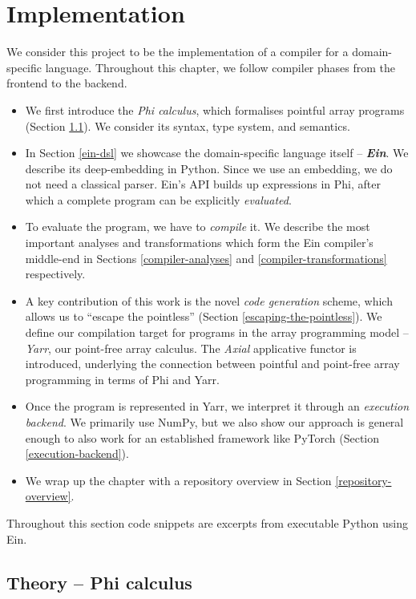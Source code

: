 \chapter{Implementation}

We consider this project to be the implementation of a compiler for a domain-specific language. Throughout this chapter, we follow compiler phases from the frontend to the backend. 
\begin{itemize}
    \item We first introduce the \textit{Phi calculus}, which formalises pointful array programs (Section \ref{phi-calculus}). We consider its syntax, type system, and semantics.
    \item In Section \ref{ein-dsl} we showcase the domain-specific language itself -- \textit{\textbf{Ein}}. We describe its deep-embedding in Python. Since we use an embedding, we do not need a classical parser. Ein's API builds up expressions in Phi, after which a complete program can be explicitly \textit{evaluated}.
    \item To evaluate the program, we have to \textit{compile} it. We describe the most important analyses and transformations which form the Ein compiler's middle-end in Sections \ref{compiler-analyses} and \ref{compiler-transformations} respectively.
    \item A key contribution of this work is the novel \textit{code generation} scheme, which allows us to ``escape the pointless'' (Section \ref{escaping-the-pointless}). We define our compilation target for programs in the array programming model -- \textit{Yarr}, our point-free array calculus. The \textit{Axial} applicative functor is introduced, underlying the connection between pointful and point-free array programming in terms of Phi and Yarr.
    \item Once the program is represented in Yarr, we interpret it through an \textit{execution backend}. We primarily use NumPy, but we also show our approach is general enough to also work for an established framework like PyTorch (Section \ref{execution-backend}).
    \item We wrap up the chapter with a repository overview in Section \ref{repository-overview}.
\end{itemize}
Throughout this section code snippets are excerpts from executable Python using Ein. 


\section{Theory -- Phi calculus}
\label{phi-calculus}

